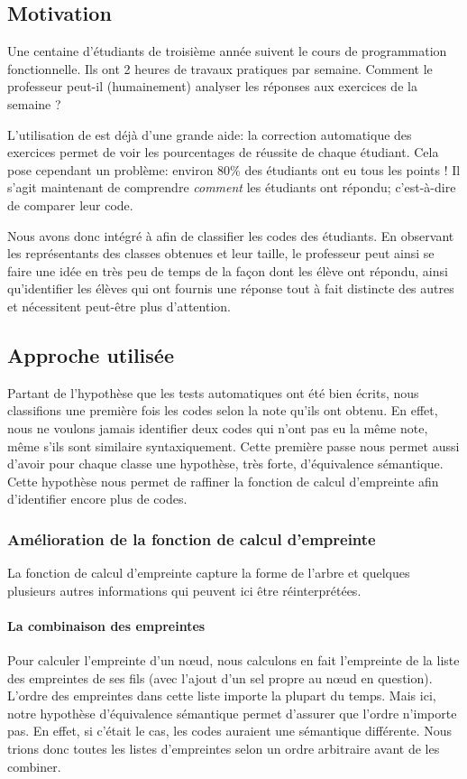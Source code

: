 
\subsection{Motivation}
Une centaine d'étudiants de troisième année suivent le cours de programmation fonctionnelle. Ils ont 2 heures de travaux pratiques par semaine. Comment le professeur peut-il (humainement) analyser les réponses aux exercices de la semaine ?

L'utilisation de {\LearnOCaml} est déjà d'une grande aide: la correction automatique des exercices permet de voir les pourcentages de réussite de chaque étudiant. Cela pose cependant un problème: environ 80\% des étudiants ont eu tous les points ! Il s'agit maintenant de comprendre \emph{comment} les étudiants ont répondu; c'est-à-dire de comparer leur code.

Nous avons donc intégré {\Asak} à {\LearnOCaml} afin de classifier les codes des étudiants. En observant les représentants des classes obtenues et leur taille, le professeur peut ainsi se faire une idée en très peu de temps de la façon dont les élève ont répondu, ainsi qu'identifier les élèves qui ont fournis une réponse tout à fait distincte des autres et nécessitent peut-être plus d'attention.

\subsection{Approche utilisée}
Partant de l'hypothèse que les tests automatiques ont été bien écrits, nous classifions une première fois les codes selon la note qu'ils ont obtenu. En effet, nous ne voulons jamais identifier deux codes qui n'ont pas eu la même note, même s'ils sont similaire syntaxiquement. Cette première passe nous permet aussi d'avoir pour chaque classe une hypothèse, très forte, d'équivalence sémantique.
Cette hypothèse nous permet de raffiner la fonction de calcul d'empreinte afin d'identifier encore plus de codes.

\subsubsection{Amélioration de la fonction de calcul d'empreinte}
La fonction de calcul d'empreinte capture la forme de l'arbre et quelques plusieurs autres informations qui peuvent ici être réinterprétées.

\paragraph{La combinaison des empreintes}
Pour calculer l'empreinte d'un nœud, nous calculons en fait l'empreinte de la liste des empreintes de ses fils (avec l'ajout d'un sel propre au nœud en question). L'ordre des empreintes dans cette liste importe la plupart du temps. Mais ici, notre hypothèse  d'équivalence sémantique permet d'assurer que l'ordre n'importe pas. En effet, si c'était le cas, les codes auraient une sémantique différente. Nous trions donc toutes les listes d'empreintes selon un ordre arbitraire avant de les combiner.

